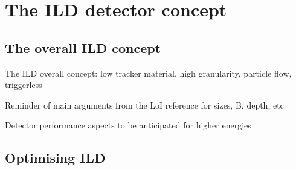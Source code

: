 \chapter{The ILD detector concept}


\section{The overall ILD concept}

The ILD overall concept: low tracker material, high granularity, particle flow, triggerless
	
Reminder of main arguments from the LoI reference for sizes, B, depth, etc 

Detector performance aspects to be anticipated for higher energies


\section{Optimising ILD}
